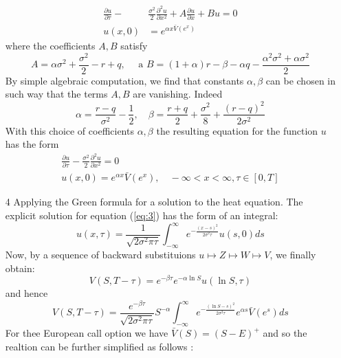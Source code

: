 \documentclass[a4paper]{article}
\begin{document}
\begin{itemize}
\begin{equation}
\begin{aligned}
    \frac{\partial u}{\partial \tau}-& \frac{\sigma^{2}}{2} \frac{\partial^{2} u}{\partial x^{2}}+A \frac{\partial u}{\partial x}+B u=0 \\
    u(x, 0) &=e^{\alpha x \bar{V}\left(e^{x}\right)}
    \end{aligned}
\end{equation}
where the coefficients $A, B$ satisfy 
\begin{equation}
    A=\alpha \sigma^{2}+\frac{\sigma^{2}}{2}-r+q, \quad \text { a } B=(1+\alpha) r-\beta-\alpha q-\frac{\alpha^{2} \sigma^{2}+\alpha \sigma^{2}}{2}
\end{equation}
By simple algebraic computation, we find that constants $\alpha, \beta$ can be chosen in such way that the terms $A, B$ are vanishing. Indeed
\begin{equation}
    \alpha=\frac{r-q}{\sigma^{2}}-\frac{1}{2}, \quad \beta=\frac{r+q}{2}+\frac{\sigma^{2}}{8}+\frac{(r-q)^{2}}{2 \sigma^{2}}
\end{equation}
With this choice of coefficients $\alpha, \beta$ the resulting equation for the function $u$ has the form
\begin{align}
    \frac{\partial u}{\partial \tau}-\frac{\sigma^{2}}{2} \frac{\partial^{2} u}{\partial x^{2}}=0 \\
    u(x, 0)=e^{\alpha x} \bar{V}\left(e^{x}\right), \quad-\infty<x<\infty, \tau \in[0, T]
    \label{eq:3}
\end{align}
    \item[4] Applying the Green formula for a solution to the heat equation. The explicit solution for equation (\ref{eq:3}) has the form of an integral:
    \begin{equation}
        u(x, \tau)=\frac{1}{\sqrt{2 \sigma^{2} \pi \tau}} \int_{-\infty}^{\infty} e^{-\frac{(x-s)^{2}}{2 \sigma^{2} \tau}} u(s, 0) d s
    \end{equation}
Now, by a sequence of backward substituions $u \mapsto Z \mapsto W \mapsto V$, we finally obtain:
    \begin{equation}
        V(S, T-\tau)=e^{-\beta \tau} e^{-\alpha \ln S} u(\ln S, \tau)
    \end{equation}
and hence
    \begin{equation}
        V(S, T-\tau)=\frac{e^{-\beta \tau}}{\sqrt{2 \sigma^{2} \pi \tau}} S^{-\alpha} \int_{-\infty}^{\infty} e^{-\frac{(\ln S-s)^{2}}{2 \sigma^{2} \tau}} e^{\alpha s} \bar{V}\left(e^{s}\right) d s
    \end{equation}
For thee European call option we have $\bar{V}(S)=(S-E)^{+}$ and so the realtion can be further simplified as follows :

\end{itemize}
\end{document}

